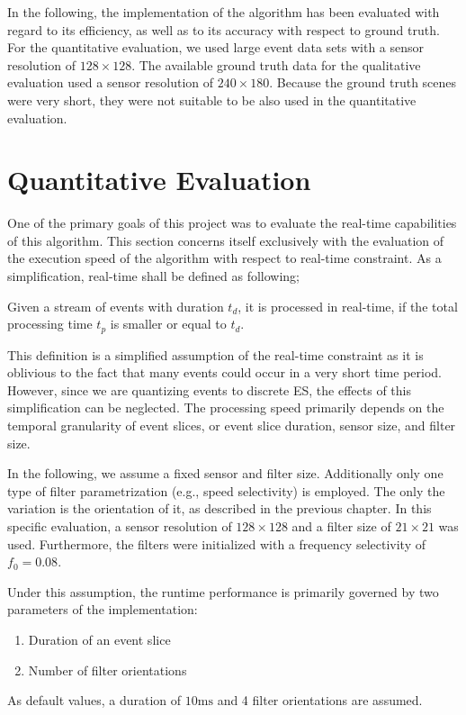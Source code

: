In the following, the implementation of the algorithm has been evaluated with regard to its efficiency, as well as to its accuracy with respect to ground truth. 
For the quantitative evaluation, we used large event data sets with a sensor resolution of $128\times128$.
The available ground truth data for the qualitative evaluation used a sensor resolution of $240\times180$.
Because the ground truth scenes were very short, they were not suitable to be also used in the quantitative evaluation.

\section{Quantitative Evaluation}

One of the primary goals of this project was to evaluate the real-time capabilities of this algorithm.
This section concerns itself exclusively with the evaluation of the execution speed of the algorithm with respect to real-time constraint. As a simplification, real-time shall be defined as following;
\begin{defwrp}
	Given a stream of events with duration $t_d$, it is processed in real-time, if the total processing time $t_p$ is smaller or equal to $t_d$.
\end{defwrp}

This definition is a simplified assumption of the real-time constraint as it is oblivious to the fact that many events could occur in a very short time period.
However, since we are quantizing events to discrete ES, the effects of this simplification can be neglected.
The processing speed primarily depends on the temporal granularity of event slices, or event slice duration, sensor size, and filter size.

In the following, we assume a fixed sensor and filter size.
Additionally only one type of filter parametrization (e.g., speed selectivity) is employed.
The only the variation is the orientation of it, as described in the previous chapter.
In this specific evaluation, a sensor resolution of $128\times128$ and a filter size of $21\times21$ was used.
Furthermore, the filters were initialized with a frequency selectivity of $f_0=0.08$.

Under this assumption, the runtime performance is primarily governed by two parameters of the implementation:
\begin{enumerate}
	\item Duration of an event slice
	\item Number of filter orientations
\end{enumerate}
As default values, a duration of $10\mathrm{ms}$ and 4 filter orientations are assumed.

